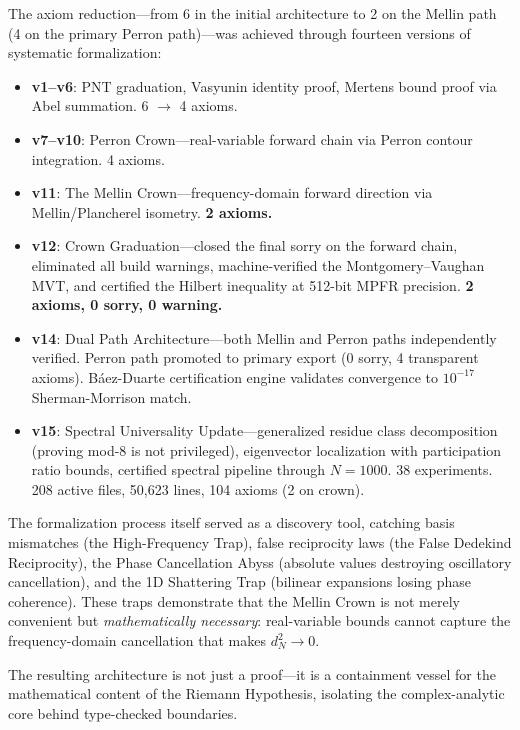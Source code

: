 \documentclass[11pt,a4paper]{article}
\begin{document}
The axiom reduction---from 6 in the initial architecture to 2 on the
Mellin path (4 on the primary Perron path)---was achieved through
fourteen versions of systematic formalization:
\begin{itemize}
  \item \textbf{v1--v6}: PNT graduation, Vasyunin identity proof,
    Mertens bound proof via Abel summation. 6 $\to$ 4 axioms.
  \item \textbf{v7--v10}: Perron Crown---real-variable forward chain
    via Perron contour integration. 4 axioms.
  \item \textbf{v11}: The Mellin Crown---frequency-domain forward
    direction via Mellin/Plancherel isometry. \textbf{2 axioms.}
  \item \textbf{v12}: Crown Graduation---closed the final sorry on the
    forward chain, eliminated all build warnings, machine-verified the
    Montgomery--Vaughan MVT, and certified the Hilbert inequality at
    512-bit MPFR precision. \textbf{2 axioms, 0 sorry, 0 warning.}
  \item \textbf{v14}: Dual Path Architecture---both Mellin and Perron
    paths independently verified. Perron path promoted to primary
    export (0 sorry, 4 transparent axioms). B\'aez-Duarte certification
    engine validates convergence to $10^{-17}$ Sherman-Morrison match.
  \item \textbf{v15}: Spectral Universality Update---generalized
    residue class decomposition (proving mod-8 is not privileged),
    eigenvector localization with participation ratio bounds,
    certified spectral pipeline through $N = 1000$. 38 experiments.
    208 active files, 50{,}623 lines, 104 axioms (2 on crown).
\end{itemize}

The formalization process itself served as a discovery tool, catching
basis mismatches (the High-Frequency Trap), false reciprocity laws
(the False Dedekind Reciprocity), the Phase Cancellation Abyss
(absolute values destroying oscillatory cancellation), and the
1D Shattering Trap (bilinear expansions losing phase coherence).
These traps demonstrate that the Mellin Crown is not merely
convenient but \emph{mathematically necessary}: real-variable bounds
cannot capture the frequency-domain cancellation that makes $d_N^2 \to 0$.

The resulting architecture is not just a proof---it is a containment
vessel for the mathematical content of the Riemann Hypothesis, isolating
the complex-analytic core behind type-checked boundaries.
\end{document}
